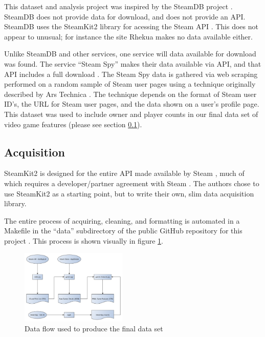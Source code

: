 \documentclass[letterpaper,10pt,twocolumn]{article}
\begin{document}
This dataset and analysis project was inspired by the SteamDB project
\cite{steamdb}. SteamDB does not provide data for download, and does not
provide an API. SteamDB uses the SteamKit2 library \cite{steamkit} for
acessing the Steam API \cite{steamdb-faq}. This does not appear to unusual;
for instance the site Rhekua \cite{rhekua} makes no data available either.

Unlike SteamDB and other services, one service will data available for
download was found. The service ``Steam Spy'' makes their data available via
API, and that API includes a full download \cite{steamspy}. The Steam Spy data
is gathered via web scraping performed on a random sample of Steam user pages
using a technique originally described by Ars Technica
\cite{steamspy-about,steamgauge}. The technique depends on the format of Steam
user ID's, the URL for Steam user pages, and the data shown on a user's
profile page. This dataset was used to include owner and player counts in our
final data set of video game features (please see section \ref{data-grab}).

\subsection{Acquisition}

\label{data-grab}

SteamKit2 is designed for the entire API made available by Steam
\cite{steamkit}, much of which requires a developer/partner agreement with
Steam \cite{steam-dev}. The authors chose to use SteamKit2 as a starting point,
but to write their own, slim data acquisition library.

The entire process of acquiring, cleaning, and formatting is automated in a
Makefile in the ``data'' subdirectory of the public GitHub repository for this
project \cite{our-github}. This process is shown visually in figure
\ref{fig:data-flow}.

\begin{figure}[H]
    \label{fig:data-flow}
    \caption{Data flow used to produce the final data set}
    \includegraphics[width=0.45\textwidth,keepaspectratio]{data-flow}
\end{figure}
\end{document}
